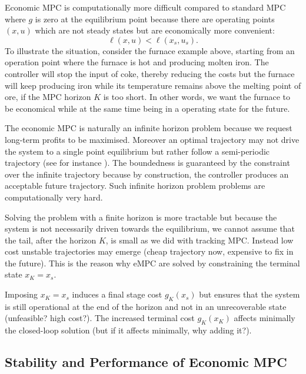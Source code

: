 Economic MPC is computationally more difficult compared to standard MPC where $g$ is zero at the equilibrium point because there are operating points $(x,u)$ which are not steady states but are economically more convenient:
\begin{equation*}
  \ell(x,u) < \ell(x_s,u_s).
\end{equation*}
To illustrate the situation, consider the furnace example above, starting from an operation point where the furnace is hot and producing molten iron. The controller will stop the input of coke, thereby reducing the costs but the furnace will keep producing iron while its temperature remains above the melting point of ore, if the MPC horizon $K$ is too short. In other words, we want the furnace to be economical while at the same time being in a operating state for the future.

The economic MPC is naturally an infinite horizon problem because we request long-term profits to be maximised. Moreover an optimal trajectory may not drive the system to a single point equilibrium but rather follow a semi-periodic trajectory (see for instance \cite[page~158]{MPC-diehl}). The boundedness is guaranteed by the constraint over the infinite trajectory because by construction, the controller produces an acceptable future trajectory. Such infinite horizon problem problems are computationally very hard.

Solving the problem with a finite horizon is more tractable but because the system is not necessarily driven towards the equilibrium, we cannot assume that the tail, after the horizon $K$, is small as we did with tracking MPC. Instead low cost unstable trajectories may emerge (cheap trajectory now, expensive to fix in the future). This is the reason why eMPC are solved by constraining the terminal state $x_K=x_s$.

Imposing $x_K=x_s$ induces a final stage cost $g_K(x_s)$ but ensures that the system is still operational at the end of the horizon and not in an unrecoverable state (unfeasible? high cost?). The increased terminal cost $g_K(x_K)$ affects minimally the closed-loop solution (but if it affects minimally, why adding it?).

\subsection{Stability and Performance of Economic MPC}
\label{sec:stability-performance-economic-MPC}

